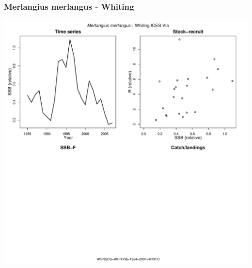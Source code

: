 \subsubsection{Merlangius merlangus - Whiting}
\begin{center}
\includegraphics[width=1.2\textwidth]{../R/figures/WGNSDS-WHITVIa-1984-2007-MINTO.pdf}
\end{center}

